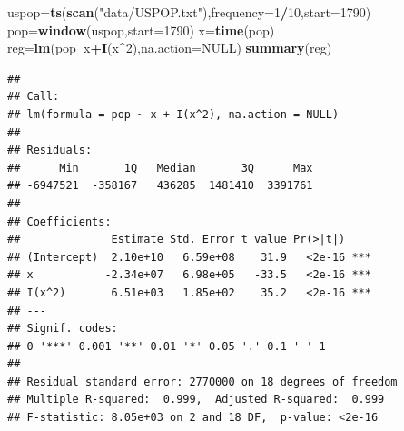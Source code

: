 \documentclass[12pt,]{krantz}
\makeatletter
\newenvironment{Shaded}{\begin{snugshade}}{\end{snugshade}}
\newcommand{\KeywordTok}[1]{\textcolor[rgb]{0.13,0.29,0.53}{\textbf{#1}}}
\newcommand{\DataTypeTok}[1]{\textcolor[rgb]{0.13,0.29,0.53}{#1}}
\newcommand{\DecValTok}[1]{\textcolor[rgb]{0.00,0.00,0.81}{#1}}
\newcommand{\StringTok}[1]{\textcolor[rgb]{0.31,0.60,0.02}{#1}}
\newcommand{\OtherTok}[1]{\textcolor[rgb]{0.56,0.35,0.01}{#1}}
\newcommand{\OperatorTok}[1]{\textcolor[rgb]{0.81,0.36,0.00}{\textbf{#1}}}
\newcommand{\NormalTok}[1]{#1}
\newenvironment{kframe}{%
\medskip{}
\setlength{\fboxsep}{.8em}
 \def\at@end@of@kframe{}%
 \ifinner\ifhmode%
  \def\at@end@of@kframe{\end{minipage}}%
  \begin{minipage}{\columnwidth}%
 \fi\fi%
 \def\FrameCommand##1{\hskip\@totalleftmargin \hskip-\fboxsep
 \colorbox{shadecolor}{##1}\hskip-\fboxsep
     \hskip-\linewidth \hskip-\@totalleftmargin \hskip\columnwidth}%
 \MakeFramed {\advance\hsize-\width
   \@totalleftmargin\z@ \linewidth\hsize
   \@setminipage}}%
 {\par\unskip\endMakeFramed%
 \at@end@of@kframe}
\renewenvironment{Shaded}{\begin{kframe}}{\end{kframe}}
\theoremstyle{definition}
\theoremstyle{definition}
\theoremstyle{definition}
\theoremstyle{remark}
\makeatother
\begin{document}
\begin{Shaded}
\begin{Highlighting}[]
\NormalTok{uspop=}\KeywordTok{ts}\NormalTok{(}\KeywordTok{scan}\NormalTok{(}\StringTok{"data/USPOP.txt"}\NormalTok{),}\DataTypeTok{frequency=}\DecValTok{1}\OperatorTok{/}\DecValTok{10}\NormalTok{,}\DataTypeTok{start=}\DecValTok{1790}\NormalTok{)}
\NormalTok{pop=}\KeywordTok{window}\NormalTok{(uspop,}\DataTypeTok{start=}\DecValTok{1790}\NormalTok{)}
\NormalTok{x=}\KeywordTok{time}\NormalTok{(pop)}
\NormalTok{reg=}\KeywordTok{lm}\NormalTok{(pop}\OperatorTok{~}\NormalTok{x}\OperatorTok{+}\KeywordTok{I}\NormalTok{(x}\OperatorTok{^}\DecValTok{2}\NormalTok{),}\DataTypeTok{na.action=}\OtherTok{NULL}\NormalTok{)}
\KeywordTok{summary}\NormalTok{(reg)}
\end{Highlighting}
\end{Shaded}

\begin{verbatim}
## 
## Call:
## lm(formula = pop ~ x + I(x^2), na.action = NULL)
## 
## Residuals:
##      Min       1Q   Median       3Q      Max 
## -6947521  -358167   436285  1481410  3391761 
## 
## Coefficients:
##              Estimate Std. Error t value Pr(>|t|)    
## (Intercept)  2.10e+10   6.59e+08    31.9   <2e-16 ***
## x           -2.34e+07   6.98e+05   -33.5   <2e-16 ***
## I(x^2)       6.51e+03   1.85e+02    35.2   <2e-16 ***
## ---
## Signif. codes:  
## 0 '***' 0.001 '**' 0.01 '*' 0.05 '.' 0.1 ' ' 1
## 
## Residual standard error: 2770000 on 18 degrees of freedom
## Multiple R-squared:  0.999,  Adjusted R-squared:  0.999 
## F-statistic: 8.05e+03 on 2 and 18 DF,  p-value: <2e-16
\end{verbatim}

\begin{Shaded}
\end{Shaded}
\end{document}

